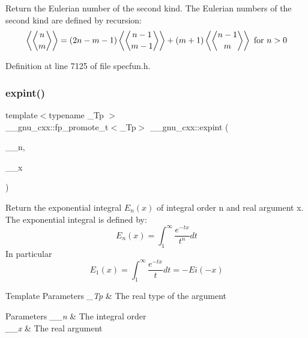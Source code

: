 Return the Eulerian number of the second kind. The Eulerian numbers of the second kind are defined by recursion\+: \[ \left\langle\genfrac{\langle}{\rangle}{0pt}{0}{n}{m}\right\rangle = (2n-m-1) \left\langle\genfrac{\langle}{\rangle}{0pt}{0}{n-1}{m-1}\right\rangle + (m+1) \left\langle\genfrac{\langle}{\rangle}{0pt}{0}{n-1}{m}\right\rangle \mbox{ for } n > 0 \] 

Definition at line 7125 of file specfun.\+h.

\mbox{\label{group__mathsf__gnu_gadaf9317953b826975da72d1858f01ea5}} 
\subsubsection{\texorpdfstring{expint()}{expint()}}
{\footnotesize\ttfamily template$<$typename \+\_\+\+Tp $>$ \\
\+\_\+\+\_\+gnu\+\_\+cxx\+::fp\+\_\+promote\+\_\+t$<$\+\_\+\+Tp$>$ \+\_\+\+\_\+gnu\+\_\+cxx\+::expint (\begin{DoxyParamCaption}\item[{unsigned int}]{\+\_\+\+\_\+n,  }\item[{\+\_\+\+Tp}]{\+\_\+\+\_\+x }\end{DoxyParamCaption})\hspace{0.3cm}{\ttfamily [inline]}}

Return the exponential integral $ E_n(x) $ of integral order {\ttfamily n} and real argument {\ttfamily x}. The exponential integral is defined by\+: \[ E_n(x) = \int_1^\infty \frac{e^{-tx}}{t^n}dt \] In particular \[ E_1(x) = \int_1^\infty \frac{e^{-tx}}{t}dt = -Ei(-x) \]


\begin{DoxyTemplParams}{Template Parameters}
{\em \+\_\+\+Tp} & The real type of the argument \\
\hline
\end{DoxyTemplParams}

\begin{DoxyParams}{Parameters}
{\em \+\_\+\+\_\+n} & The integral order \\
\hline
{\em \+\_\+\+\_\+x} & The real argument \\
\hline
\end{DoxyParams}


